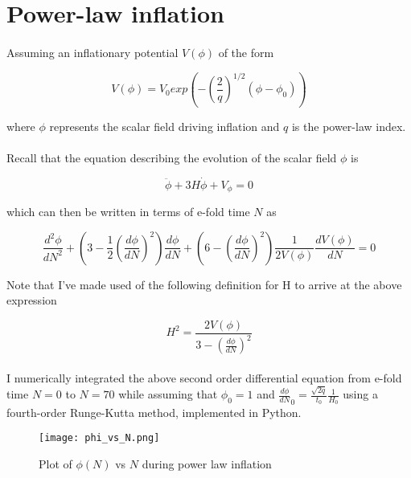 \documentclass[12pt,a4paper,oneside]{book}
\begin{document}
\section{Power-law inflation}

\paragraph{} Assuming an inflationary potential $V(\phi)$ of the form

\begin{equation}
V(\phi) = V_0 exp(-(\frac{2}{q})^{1/2}(\phi - \phi_0))
\end{equation}

\noindent where $\phi$ represents the scalar field driving inflation and $q$ is the power-law index.

\paragraph*{} Recall that the equation describing the evolution of the scalar field $\phi$ is

\begin{equation}
\ddot{\phi} + 3H\dot{\phi} + V_{\phi} = 0
\end{equation}

\noindent which can then be written in terms of e-fold time $N$ as

\begin{equation}
\frac{d^2\phi}{dN^2} + (3 - \frac{1}{2}(\frac{d\phi}{dN})^2)\frac{d\phi}{dN} + (6 - (\frac{d\phi}{dN})^2)\frac{1}{2V(\phi)}\frac{dV(\phi)}{dN} = 0
\end{equation}

\noindent Note that I've made used of the following definition for H to arrive at the above expression

\begin{equation}
H^2 = \frac{2V(\phi)}{3-(\frac{d\phi}{dN})^2}
\end{equation}

\paragraph*{} I numerically integrated the above second order differential equation from e-fold time $N = 0$ to $N = 70$ while assuming that $\phi_0 = 1$ and $\frac{d\phi}{dN}_0 = \frac{\sqrt{2q}}{t_0}\frac{1}{H_0}$ using a fourth-order Runge-Kutta method, implemented in Python.

\begin{figure}
\begin{center}
\texttt{[image: phi\_vs\_N.png]}
\caption[Plot of $\phi(N)$ vs $N$ during power law inflation]{Plot of $\phi(N)$ vs $N$ during power law inflation}
\label{blah}
\end{center}
\end{figure}
\end{document}
